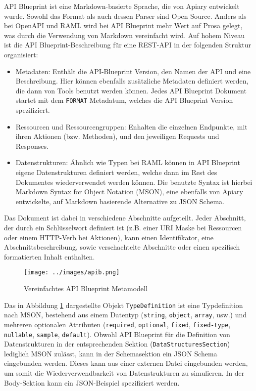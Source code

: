 API Blueprint ist eine Markdown-basierte Sprache, die von Apiary entwickelt wurde. Sowohl das Format als auch dessen Parser sind Open Source. Anders als bei OpenAPI und RAML wird bei API Blueprint mehr Wert auf Prosa gelegt, was durch die Verwendung von Markdown vereinfacht wird. Auf hohem Niveau ist die API Blueprint-Beschreibung für eine REST-API in der folgenden Struktur organisiert: \\

\begin{itemize}
	\item Metadaten: Enthält die API-Blueprint Version, den Namen der API und eine Beschreibung. Hier können ebenfalls zusätzliche Metadaten definiert werden, die dann von Tools benutzt werden können. Jedes API Blueprint Dokument startet mit dem \lstinline|FORMAT| Metadatum, welches die API Blueprint Version spezifiziert.
	\item Ressourcen und Ressourcengruppen: Enhalten die einzelnen Endpunkte, mit ihren Aktionen (bzw. Methoden), und den jeweiligen Requests und Responses.
	\item Datenstrukturen: Ähnlich wie Typen bei RAML können in API Blueprint eigene Datenstrukturen definiert werden, welche dann im Rest des Dokumentes wiederverwendet werden können. Die benutzte Syntax ist hierbei Markdown Syntax for Object Notation (MSON), eine ebenfalls von Apiary entwickelte, auf Markdown basierende  Alternative zu JSON Schema.
\end{itemize}

Das Dokument ist dabei in verschiedene Abschnitte aufgeteilt. Jeder Abschnitt, der durch ein Schlüsselwort definiert ist (z.B. einer URI Maske bei Ressourcen oder einem HTTP-Verb bei Aktionen), kann einen Identifikator, eine Abschnittsbeschreibung, sowie verschachtelte Abschnitte oder einen spezifisch formatierten Inhalt enthalten. 

\begin{figure}[H]
  \texttt{[image: ../images/apib.png]}
  \caption{Vereinfachtes API Blueprint Metamodell}
  \label{fig:apib}
\end{figure}

Das in Abbildung \ref{fig:apib} dargestellte Objekt \lstinline|TypeDefinition| ist eine Typdefinition nach MSON, bestehend aus einem Datentyp (\lstinline|string|, \lstinline|object|, \lstinline|array|, usw.) und mehreren optionalen Attributen (\lstinline|required|, \lstinline|optional|, \lstinline|fixed|, \lstinline|fixed-type|, \lstinline|nullable|, \lstinline|sample|, \lstinline|default|). Obwohl API Blueprint für die Definition von Datenstrukturen in der entsprechenden Sektion (\lstinline|DataStructuresSection|) lediglich MSON zulässt, kann in der Schemasektion ein JSON Schema eingebunden werden. Dieses kann aus einer externen Datei eingebunden werden, um somit die Wiederverwendbarkeit von Datenstrukturen zu simulieren. In der Body-Sektion kann ein JSON-Beispiel spezifiziert werden. \\

